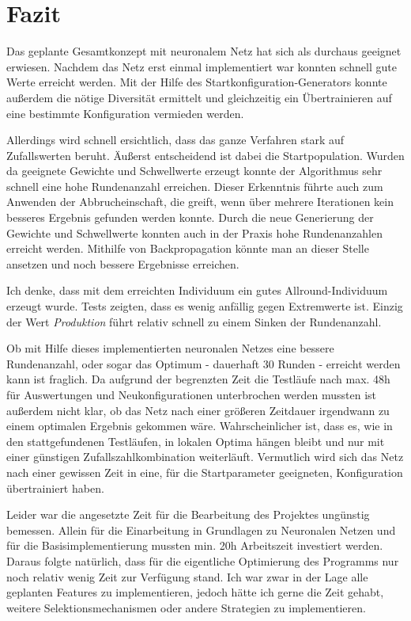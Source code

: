 \chapter{Fazit}

Das geplante Gesamtkonzept mit neuronalem Netz hat sich als durchaus geeignet erwiesen. Nachdem das Netz erst einmal implementiert war konnten schnell gute Werte erreicht werden. Mit der Hilfe des Startkonfiguration-Generators konnte außerdem die nötige Diversität ermittelt und gleichzeitig ein Übertrainieren auf eine bestimmte Konfiguration vermieden werden.

Allerdings wird schnell ersichtlich, dass das ganze Verfahren stark auf Zufallswerten beruht. Äußerst entscheidend ist dabei die Startpopulation. Wurden da geeignete Gewichte und Schwellwerte erzeugt konnte der Algorithmus sehr schnell eine hohe Rundenanzahl erreichen. Dieser Erkenntnis führte auch zum Anwenden der Abbrucheinschaft, die greift, wenn über mehrere Iterationen kein besseres Ergebnis gefunden werden konnte. Durch die neue Generierung der Gewichte und Schwellwerte konnten auch in der Praxis hohe Rundenanzahlen erreicht werden. Mithilfe von Backpropagation könnte man an dieser Stelle ansetzen und noch bessere Ergebnisse erreichen. 

Ich denke, dass mit dem erreichten Individuum ein gutes Allround-Individuum erzeugt wurde. Tests zeigten, dass es wenig anfällig gegen Extremwerte ist. Einzig der Wert \emph{Produktion} führt  relativ schnell zu einem Sinken der Rundenanzahl.

Ob mit Hilfe dieses implementierten neuronalen Netzes eine bessere Rundenanzahl, oder sogar das Optimum - dauerhaft 30 Runden - erreicht werden kann ist fraglich. Da aufgrund der begrenzten Zeit die Testläufe nach max. 48h für Auswertungen und Neukonfigurationen unterbrochen werden mussten ist außerdem nicht klar, ob das Netz nach einer größeren Zeitdauer irgendwann zu einem optimalen Ergebnis gekommen wäre. Wahrscheinlicher ist, dass es, wie in den stattgefundenen Testläufen, in lokalen Optima hängen bleibt und nur mit einer günstigen Zufallszahlkombination weiterläuft. Vermutlich wird sich das Netz nach einer gewissen Zeit in eine, für die Startparameter geeigneten, Konfiguration übertrainiert haben.

Leider war die angesetzte Zeit für die Bearbeitung des Projektes ungünstig bemessen. Allein für die Einarbeitung in Grundlagen zu Neuronalen Netzen und für die Basisimplementierung mussten min. 20h Arbeitszeit investiert werden. Daraus folgte natürlich, dass für die eigentliche Optimierung des Programms nur noch relativ wenig Zeit zur Verfügung stand. Ich war zwar in der Lage alle geplanten Features zu implementieren, jedoch hätte ich gerne die Zeit gehabt, weitere Selektionsmechanismen oder andere Strategien zu implementieren.
